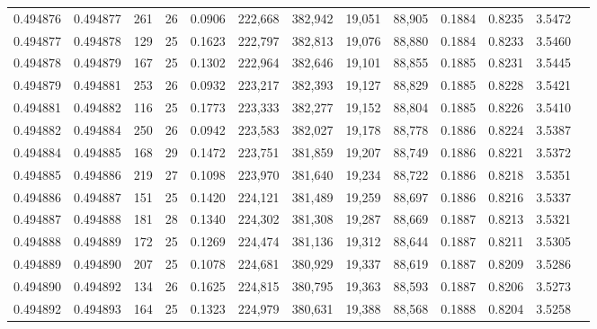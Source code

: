 \begin{tabular}{rrrrrrrrrrrrr}
0.494876 & 0.494877 & 261 &  26 &                                     0.0906 & 222,668 & 382,942 &  19,051 &  88,905 & 0.1884 & 0.8235 & 3.5472 \\
0.494877 & 0.494878 & 129 &  25 &                                     0.1623 & 222,797 & 382,813 &  19,076 &  88,880 & 0.1884 & 0.8233 & 3.5460 \\
0.494878 & 0.494879 & 167 &  25 &                                     0.1302 & 222,964 & 382,646 &  19,101 &  88,855 & 0.1885 & 0.8231 & 3.5445 \\
0.494879 & 0.494881 & 253 &  26 &                                     0.0932 & 223,217 & 382,393 &  19,127 &  88,829 & 0.1885 & 0.8228 & 3.5421 \\
0.494881 & 0.494882 & 116 &  25 &                                     0.1773 & 223,333 & 382,277 &  19,152 &  88,804 & 0.1885 & 0.8226 & 3.5410 \\
0.494882 & 0.494884 & 250 &  26 &                                     0.0942 & 223,583 & 382,027 &  19,178 &  88,778 & 0.1886 & 0.8224 & 3.5387 \\
0.494884 & 0.494885 & 168 &  29 &                                     0.1472 & 223,751 & 381,859 &  19,207 &  88,749 & 0.1886 & 0.8221 & 3.5372 \\
0.494885 & 0.494886 & 219 &  27 &                                     0.1098 & 223,970 & 381,640 &  19,234 &  88,722 & 0.1886 & 0.8218 & 3.5351 \\
0.494886 & 0.494887 & 151 &  25 &                                     0.1420 & 224,121 & 381,489 &  19,259 &  88,697 & 0.1886 & 0.8216 & 3.5337 \\
0.494887 & 0.494888 & 181 &  28 &                                     0.1340 & 224,302 & 381,308 &  19,287 &  88,669 & 0.1887 & 0.8213 & 3.5321 \\
0.494888 & 0.494889 & 172 &  25 &                                     0.1269 & 224,474 & 381,136 &  19,312 &  88,644 & 0.1887 & 0.8211 & 3.5305 \\
0.494889 & 0.494890 & 207 &  25 &                                     0.1078 & 224,681 & 380,929 &  19,337 &  88,619 & 0.1887 & 0.8209 & 3.5286 \\
0.494890 & 0.494892 & 134 &  26 &                                     0.1625 & 224,815 & 380,795 &  19,363 &  88,593 & 0.1887 & 0.8206 & 3.5273 \\
0.494892 & 0.494893 & 164 &  25 &                                     0.1323 & 224,979 & 380,631 &  19,388 &  88,568 & 0.1888 & 0.8204 & 3.5258 \\

\end{tabular}
